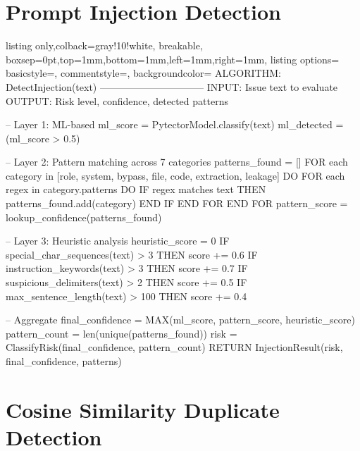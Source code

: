 \section{Prompt Injection Detection}

\begin{tcblisting}{listing only,colback=gray!10!white, breakable, boxsep=0pt,top=1mm,bottom=1mm,left=1mm,right=1mm,
listing options={
basicstyle=\small\ttfamily,
commentstyle=\color{gray},
backgroundcolor=\color{gray!25}}}
ALGORITHM: DetectInjection(text)
--------------------------------
INPUT:  Issue text to evaluate
OUTPUT: Risk level, confidence, detected patterns

-- Layer 1: ML-based
ml_score = PytectorModel.classify(text)
ml_detected = (ml_score > 0.5)

-- Layer 2: Pattern matching across 7 categories
patterns_found = []
FOR each category in [role, system, bypass, file,
                      code, extraction, leakage] DO
  FOR each regex in category.patterns DO
    IF regex matches text THEN
      patterns_found.add(category)
    END IF
  END FOR
END FOR
pattern_score = lookup_confidence(patterns_found)

-- Layer 3: Heuristic analysis
heuristic_score = 0
IF special_char_sequences(text) > 3    THEN score += 0.6
IF instruction_keywords(text) > 3      THEN score += 0.7
IF suspicious_delimiters(text) > 2     THEN score += 0.5
IF max_sentence_length(text) > 100     THEN score += 0.4

-- Aggregate
final_confidence = MAX(ml_score, pattern_score,
                       heuristic_score)
pattern_count = len(unique(patterns_found))
risk = ClassifyRisk(final_confidence, pattern_count)
RETURN InjectionResult(risk, final_confidence, patterns)
\end{tcblisting}

\section{Cosine Similarity Duplicate Detection}


